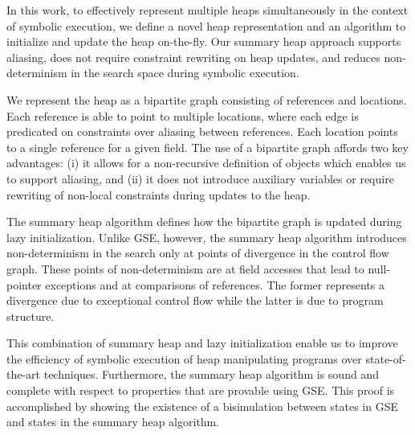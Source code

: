 
In this work, to effectively represent multiple heaps simultaneously
in the context of symbolic execution, we define a novel heap
representation and an algorithm to initialize and update the heap
on-the-fly. Our summary heap approach supports aliasing, does not
require constraint rewriting on heap updates, and reduces
non-determinism in the search space during symbolic execution.

We represent the heap as a bipartite graph consisting of references
and locations. Each reference is able to point to multiple locations,
where each edge is predicated on constraints over aliasing between
references. Each location points to a single reference for a given
field. The use of a bipartite graph affords two key advantages: (i)
it allows for a non-recursive definition of objects which enables us
to support aliasing, and (ii) it does not introduce auxiliary variables or 
require rewriting of non-local constraints during updates to the heap.

The summary heap algorithm defines how the bipartite graph is updated
during lazy initialization. Unlike GSE, however, the summary heap
algorithm introduces non-determinism in the search only at points of
divergence in the control flow graph. These points of non-determinism
are at field accesses that lead to null-pointer exceptions
and at comparisons of references. The former represents a divergence
due to exceptional control flow while the latter is due to program
structure. 


This combination of summary heap and lazy initialization
enable us to improve the efficiency of symbolic execution of heap
manipulating programs over state-of-the-art techniques.
Furthermore, the summary heap algorithm is sound and complete with
respect to properties that are provable using GSE. This proof is
accomplished by showing the existence of a bisimulation
between states in GSE and states in the summary heap algorithm. 
\begin{comment}
In
practical terms, any property that can be proved using GSE can also be
proved using summary heaps, and, any property proved by
summary heaps can also be proved by GSE. Of course, both require a
bound on heap reference chains and loops.
\end{comment}

